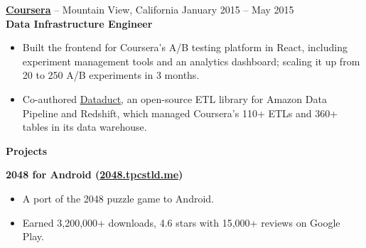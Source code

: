 \documentclass{letter}
\begin{document}
\vspace{-1.5mm}
{\bfseries \href{https://www.coursera.org}{\uline{Coursera}}} -- Mountain View, California \hfill January 2015 -- May 2015 \\
{\bfseries Data Infrastructure Engineer}
\vspace{-3mm}
\begin{itemize}
    \item Built the frontend for Coursera's A/B testing platform in React,
      including experiment management tools and an analytics dashboard; scaling
      it up from 20 to 250 A/B experiments in 3 months.
    \item Co-authored \href{https://github.com/coursera/dataduct}{\uline{Dataduct}},
      an open-source ETL library for Amazon Data Pipeline and Redshift, which
      managed Coursera's 110+ ETLs and 360+ tables in its data warehouse.
\end{itemize}


{\bfseries \Large Projects}

\vspace{-10mm}
\null\hrulefill

\vspace{-1.5mm}
{\bfseries 2048 for Android (\href{http://2048.tpcstld.me}{\uline{2048.tpcstld.me}})}
\vspace{-3mm}
\begin{itemize}
    \item A port of the 2048 puzzle game to Android.
    \item Earned 3,200,000+ downloads, 4.6 stars with 15,000+ reviews on Google
      Play.
\end{itemize}
\end{document}
